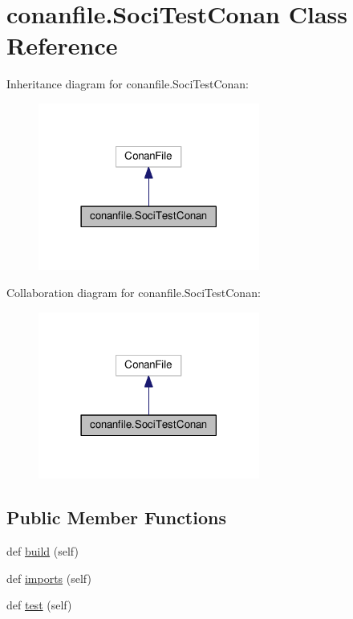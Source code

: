 \hypertarget{classconanfile_1_1_soci_test_conan}{}\section{conanfile.\+Soci\+Test\+Conan Class Reference}
\label{classconanfile_1_1_soci_test_conan}


Inheritance diagram for conanfile.\+Soci\+Test\+Conan\+:
\nopagebreak
\begin{figure}[H]
\begin{center}
\leavevmode
\includegraphics[width=206pt]{classconanfile_1_1_soci_test_conan__inherit__graph}
\end{center}
\end{figure}


Collaboration diagram for conanfile.\+Soci\+Test\+Conan\+:
\nopagebreak
\begin{figure}[H]
\begin{center}
\leavevmode
\includegraphics[width=206pt]{classconanfile_1_1_soci_test_conan__coll__graph}
\end{center}
\end{figure}
\subsection*{Public Member Functions}
\begin{DoxyCompactItemize}
\item 
def \hyperlink{classconanfile_1_1_soci_test_conan_af3b03984b8ebb78ebe74bd950c1bf4c0}{build} (self)
\item 
def \hyperlink{classconanfile_1_1_soci_test_conan_ad013a68ed9439090766ffe1e5def31b9}{imports} (self)
\item 
def \hyperlink{classconanfile_1_1_soci_test_conan_aaee7ccaf4ca21575af1e8488241a34d3}{test} (self)
\end{DoxyCompactItemize}
